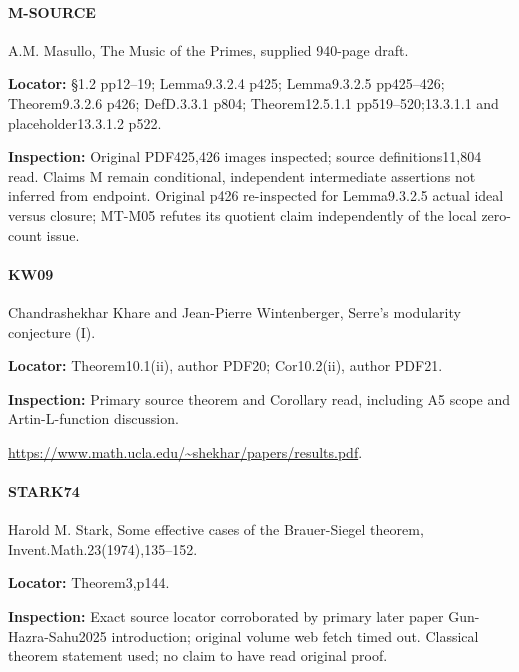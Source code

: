\documentclass[11pt,a4paper]{article}
\begin{document}
\paragraph{M-SOURCE} A.\allowbreak{}M.\allowbreak{} Masullo, The Music of the Primes, supplied 940-page draft.

\textbf{Locator:} §1.\allowbreak{}2 pp12–\allowbreak{}19; Lemma9.\allowbreak{}3.\allowbreak{}2.\allowbreak{}4 p425; Lemma9.\allowbreak{}3.\allowbreak{}2.\allowbreak{}5 pp425–\allowbreak{}426; Theorem9.\allowbreak{}3.\allowbreak{}2.\allowbreak{}6 p426; DefD.\allowbreak{}3.\allowbreak{}3.\allowbreak{}1 p804; Theorem12.\allowbreak{}5.\allowbreak{}1.\allowbreak{}1 pp519–\allowbreak{}520;13.\allowbreak{}3.\allowbreak{}1.\allowbreak{}1 and placeholder13.\allowbreak{}3.\allowbreak{}1.\allowbreak{}2 p522.

\textbf{Inspection:} Original PDF425,426 images inspected; source definitions11,804 read.\allowbreak{} Claims M remain conditional, independent intermediate assertions not inferred from endpoint.\allowbreak{} Original p426 re-inspected for Lemma9.\allowbreak{}3.\allowbreak{}2.\allowbreak{}5 actual ideal versus closure; MT-M05 refutes its quotient claim independently of the local zero-count issue.\allowbreak{}


\paragraph{KW09} Chandrashekhar Khare and Jean-Pierre Wintenberger, Serre's modularity conjecture (I).

\textbf{Locator:} Theorem10.\allowbreak{}1(ii), author PDF20; Cor10.\allowbreak{}2(ii), author PDF21.

\textbf{Inspection:} Primary source theorem and Corollary read, including A5 scope and Artin-L-function discussion.\allowbreak{}

\url{https://www.math.ucla.edu/~shekhar/papers/results.pdf}.

\paragraph{STARK74} Harold M.\allowbreak{} Stark, Some effective cases of the Brauer-Siegel theorem, Invent.\allowbreak{}Math.\allowbreak{}23(1974),135–\allowbreak{}152.

\textbf{Locator:} Theorem3,p144.

\textbf{Inspection:} Exact source locator corroborated by primary later paper Gun-Hazra-Sahu2025 introduction; original volume web fetch timed out.\allowbreak{} Classical theorem statement used; no claim to have read original proof.\allowbreak{}
\end{document}

